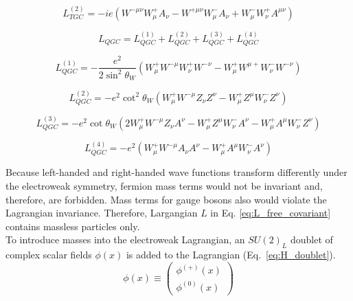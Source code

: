 \begin{equation} \label{eq:L_TGC_2_2}
L_{TGC}^{(2)} = - ie(W^{-\mu\nu}W^+_\mu A_\nu - W^{+\mu\nu}W^-_\mu A_\nu + W^-_\mu W^+_\nu A^{\mu\nu})
\end{equation}

\begin{equation} \label{eq:L_QGC_2}
L_{QGC} = L_{QGC}^{(1)} + L_{QGC}^{(2)} + L_{QGC}^{(3)} + L_{QGC}^{(4)}
\end{equation}

\begin{equation} \label{eq:L_QGC_2_1}
L_{QGC}^{(1)} = -\frac{e^2}{2\sin^2 \theta_W}(W^+_\mu W^{-\mu}W^+_\nu W^{-\nu} - W^+_\mu W^{\mu +} W^-_\nu W^{-\nu})
\end{equation}

\begin{equation} \label{eq:L_QGC_2_2}
L_{QGC}^{(2)} = - e^2 \cot^2 \theta_W (W^+_\mu W^{-\mu} Z_\nu Z^{\nu} - W^+_\mu Z^{\mu} W^-_\nu Z^{\nu})
\end{equation}

\begin{equation} \label{eq:L_QGC_2_3}
L_{QGC}^{(3)} = - e^2 \cot \theta_W (2 W_\mu^+ W^{-\mu} Z_\nu A^{\nu} - W^{+}_\mu Z^\mu W^-_\nu A^\nu - W^{+}_\mu A^\mu W^-_\nu Z^\nu)
\end{equation}

\begin{equation} \label{eq:L_QGC_2_4}
L_{QGC}^{(4)} = - e^2 (W^+_\mu W^{-\mu} A_\nu A^{\nu} - W^+_\mu A^{\mu} W^-_\nu A^{\nu})
\end{equation}

Because left-handed and right-handed wave functions transform differently under the electroweak symmetry, fermion mass terms would not be invariant and, therefore, are forbidden. Mass terms for gauge bosons also would violate the Lagrangian invariance. Therefore, Largangian $L$ in Eq. \ref{eq:L_free_covariant} contains massless particles only.\\

To introduce masses into the electroweak Lagrangian, an $SU(2)_L$ doublet of complex scalar fields $\phi(x)$ is added to the Lagrangian (Eq.~\ref{eq:H_doublet}).\\

\begin{equation}\label{eq:H_doublet}
  \phi(x) \equiv \begin{pmatrix} \phi^{(+)}(x) \\ \phi^{(0)}(x) \end{pmatrix}
\end{equation}

